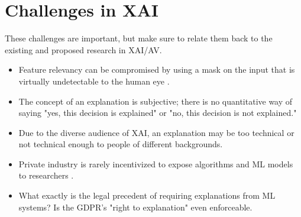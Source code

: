 \section{Challenges in XAI} \label{sec:Challenges}

These challenges are important, but make sure to relate them back to the existing and proposed research in XAI/AV.

\begin{itemize}
    \item Feature relevancy can be compromised by using a mask on the input that is virtually undetectable to the human eye \cite{DBLP:journals/corr/abs-1812-00891}.

    \item The concept of an explanation is subjective; there is no quantitative way of saying "yes, this decision is explained" or "no, this decision is not explained." \cite{Bibal2016}

    \item Due to the diverse audience of XAI, an explanation may be too technical or not technical enough to people of different backgrounds.
    
    \item Private industry is rarely incentivized to expose algorithms and ML models to researchers \cite{Veale:2018:FAD:3173574.3174014}.
    
    \item What exactly is the legal precedent of requiring explanations from ML systems?  Is the GDPR's "right to explanation" even enforceable. \cite{Mittelstadt2017}
\end{itemize}
